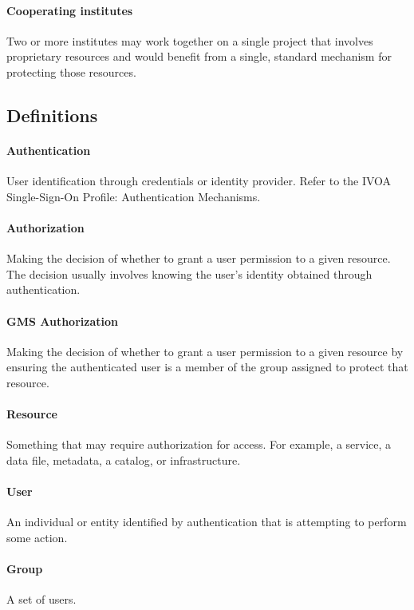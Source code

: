 \documentclass[11pt,a4paper]{ivoa}
\begin{document}
\paragraph{Cooperating institutes} Two or more institutes may work together on a single project that involves proprietary resources and would benefit from a single, standard mechanism for protecting those resources.

\subsection{Definitions}

\paragraph{Authentication} User identification through credentials or identity provider.  Refer to the IVOA Single-Sign-On Profile: Authentication Mechanisms.  \citep{2017ivoa.spec.0524T}

\paragraph{Authorization} Making the decision of whether to grant a user permission to a given resource.  The decision usually involves knowing the user's identity obtained through authentication.

\paragraph{GMS Authorization} Making the decision of whether to grant a user permission to a given resource by ensuring the authenticated user is a member of the group assigned to protect that resource.

\paragraph{Resource} Something that may require authorization for access.  For example, a service, a data file, metadata, a catalog, or infrastructure.

\paragraph{User} An individual or entity identified by authentication that is attempting to perform some action.

\paragraph{Group} A set of users.
\end{document}
